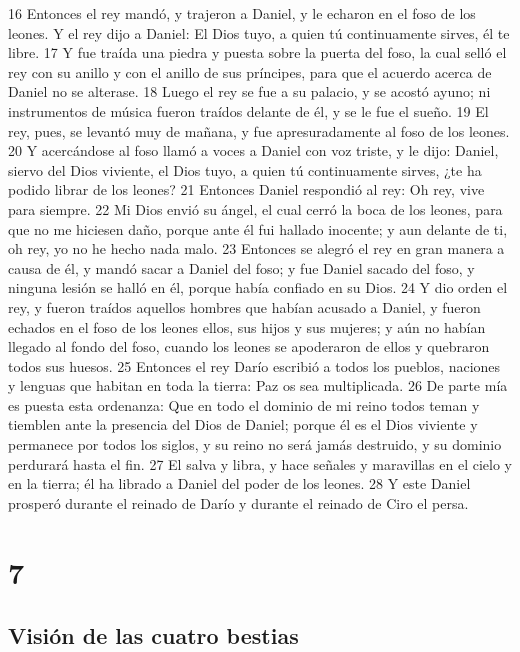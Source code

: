 16 Entonces el rey mandó, y trajeron a Daniel, y le echaron en el foso de los leones. Y el rey dijo a Daniel: El Dios tuyo, a quien tú continuamente sirves, él te libre.
17 Y fue traída una piedra y puesta sobre la puerta del foso, la cual selló el rey con su anillo y con el anillo de sus príncipes, para que el acuerdo acerca de Daniel no se alterase.
18 Luego el rey se fue a su palacio, y se acostó ayuno; ni instrumentos de música fueron traídos delante de él, y se le fue el sueño.
19 El rey, pues, se levantó muy de mañana, y fue apresuradamente al foso de los leones.
20 Y acercándose al foso llamó a voces a Daniel con voz triste, y le dijo: Daniel, siervo del Dios viviente, el Dios tuyo, a quien tú continuamente sirves, ¿te ha podido librar de los leones?
21 Entonces Daniel respondió al rey: Oh rey, vive para siempre.
22 Mi Dios envió su ángel, el cual cerró la boca de los leones, para que no me hiciesen daño, porque ante él fui hallado inocente; y aun delante de ti, oh rey, yo no he hecho nada malo.
23 Entonces se alegró el rey en gran manera a causa de él, y mandó sacar a Daniel del foso; y fue Daniel sacado del foso, y ninguna lesión se halló en él, porque había confiado en su Dios.
24 Y dio orden el rey, y fueron traídos aquellos hombres que habían acusado a Daniel, y fueron echados en el foso de los leones ellos, sus hijos y sus mujeres; y aún no habían llegado al fondo del foso, cuando los leones se apoderaron de ellos y quebraron todos sus huesos.
25 Entonces el rey Darío escribió a todos los pueblos, naciones y lenguas que habitan en toda la tierra: Paz os sea multiplicada.
26 De parte mía es puesta esta ordenanza: Que en todo el dominio de mi reino todos teman y tiemblen ante la presencia del Dios de Daniel; porque él es el Dios viviente y permanece por todos los siglos, y su reino no será jamás destruido, y su dominio perdurará hasta el fin.
27 El salva y libra, y hace señales y maravillas en el cielo y en la tierra; él ha librado a Daniel del poder de los leones.
28 Y este Daniel prosperó durante el reinado de Darío y durante el reinado de Ciro el persa.

\chapter{7}

\section*{Visión de las cuatro bestias}

